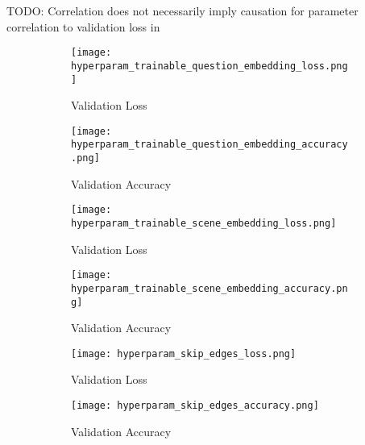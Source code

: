 {\color{red} TODO: Correlation does not necessarily imply causation for parameter correlation to validation loss in \figureautorefname{ \ref{fig:hyperparam_importance_and_correlation}}}

\begin{figure}
    \centering
    \begin{subfigure}[l]{0.5\textwidth}
        \texttt{[image: hyperparam\_trainable\_question\_embedding\_loss.png]}
        \label{fig:hyperparam_trainable_question_embedding_loss}
        \caption{Validation Loss}
    \end{subfigure}
    \begin{subfigure}[r]{0.49\textwidth}
        \texttt{[image: hyperparam\_trainable\_question\_embedding\_accuracy.png]}
        \label{fig:hyperparam_trainable_question_embedding_accuracy}
        \caption{Validation Accuracy}
    \end{subfigure}
    \caption{}
    \label{fig:hyperparam_trainable_question_embedding_loss_and_accuracy}
\end{figure}
 
\begin{figure}
    \centering
    \begin{subfigure}[l]{0.5\textwidth}
        \texttt{[image: hyperparam\_trainable\_scene\_embedding\_loss.png]}
        \label{fig:hyperparam_trainable_scene_embedding_loss}
        \caption{Validation Loss}
    \end{subfigure}
    \begin{subfigure}[r]{0.49\textwidth}
        \texttt{[image: hyperparam\_trainable\_scene\_embedding\_accuracy.png]}
        \label{fig:hyperparam_trainable_scene_embedding_accuracy}
        \caption{Validation Accuracy}
    \end{subfigure}
    \caption{}
    \label{fig:hyperparam_trainable_scene_embedding_loss_and_accuracy}
\end{figure}

\begin{figure}
    \centering
    \begin{subfigure}[l]{0.5\textwidth}
        \texttt{[image: hyperparam\_skip\_edges\_loss.png]}
        \label{fig:hyperparam_skip_edges_loss}
        \caption{Validation Loss}
    \end{subfigure}
    \begin{subfigure}[r]{0.49\textwidth}
        \texttt{[image: hyperparam\_skip\_edges\_accuracy.png]}
        \label{fig:hyperparam_skip_edges_accuracy}
        \caption{Validation Accuracy}
    \end{subfigure}
    \caption{}
    \label{fig:hyperparam_skip_edges_loss_and_accuracy}
\end{figure}

